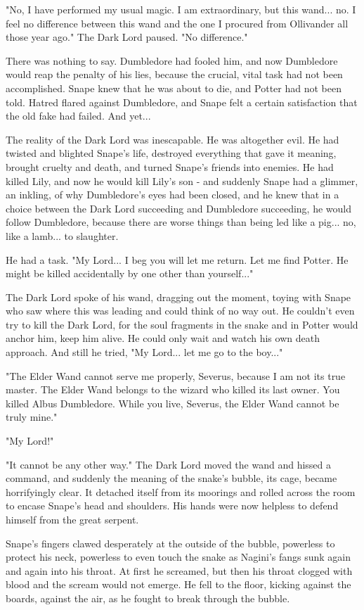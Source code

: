 "No, I have performed my usual magic. I am extraordinary, but this wand... no. I feel no difference between this wand and the one I procured from Ollivander all those year ago." The Dark Lord paused. "No difference."

There was nothing to say. Dumbledore had fooled him, and now Dumbledore would reap the penalty of his lies, because the crucial, vital task had not been accomplished. Snape knew that he was about to die, and Potter had not been told. Hatred flared against Dumbledore, and Snape felt a certain satisfaction that the old fake had failed. And yet...

The reality of the Dark Lord was inescapable. He was altogether evil. He had twisted and blighted Snape's life, destroyed everything that gave it meaning, brought cruelty and death, and turned Snape's friends into enemies. He had killed Lily, and now he would kill Lily's son - and suddenly Snape had a glimmer, an inkling, of why Dumbledore's eyes had been closed, and he knew that in a choice between the Dark Lord succeeding and Dumbledore succeeding, he would follow Dumbledore, because there are worse things than being led like a pig... no, like a lamb... to slaughter.

He had a task. "My Lord... I beg you will let me return. Let me find Potter. He might be killed accidentally by one other than yourself..."

The Dark Lord spoke of his wand, dragging out the moment, toying with Snape who saw where this was leading and could think of no way out. He couldn't even try to kill the Dark Lord, for the soul fragments in the snake and in Potter would anchor him, keep him alive. He could only wait and watch his own death approach. And still he tried, "My Lord... let me go to the boy..."

"The Elder Wand cannot serve me properly, Severus, because I am not its true master. The Elder Wand belongs to the wizard who killed its last owner. You killed Albus Dumbledore. While you live, Severus, the Elder Wand cannot be truly mine."

"My Lord!"

"It cannot be any other way." The Dark Lord moved the wand and hissed a command, and suddenly the meaning of the snake's bubble, its cage, became horrifyingly clear. It detached itself from its moorings and rolled across the room to encase Snape's head and shoulders. His hands were now helpless to defend himself from the great serpent.

Snape's fingers clawed desperately at the outside of the bubble, powerless to protect his neck, powerless to even touch the snake as Nagini's fangs sunk again and again into his throat. At first he screamed, but then his throat clogged with blood and the scream would not emerge. He fell to the floor, kicking against the boards, against the air, as he fought to break through the bubble.

